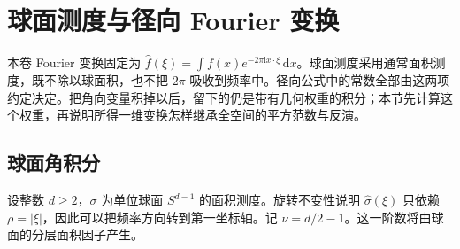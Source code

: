 \section{球面测度与径向 Fourier 变换}
\label{b2:sec:A202}

本卷 Fourier 变换固定为 \(\widehat f(\xi)=\int f(x)e^{-2\pi\mathrm i x\cdot\xi}\,\mathrm dx\)。球面测度采用通常面积测度，既不除以球面积，也不把 \(2\pi\) 吸收到频率中。径向公式中的常数全部由这两项约定决定。把角向变量积掉以后，留下的仍是带有几何权重的积分；本节先计算这个权重，再说明所得一维变换怎样继承全空间的平方范数与反演。

\subsection{球面角积分}
\label{b2:subsec:A20201}

设整数 \(d\ge2\)，\(\sigma\) 为单位球面 \(S^{d-1}\) 的面积测度。旋转不变性说明 \(\widehat\sigma(\xi)\) 只依赖 \(\rho=|\xi|\)，因此可以把频率方向转到第一坐标轴。记 \(\nu=d/2-1\)。这一阶数将由球面的分层面积因子产生。

